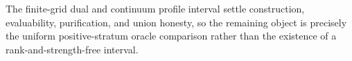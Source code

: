 The finite-grid dual and continuum profile interval settle construction, evaluability, purification, and union honesty, so the remaining object is precisely the uniform positive-stratum oracle comparison rather than the existence of a rank-and-strength-free interval.